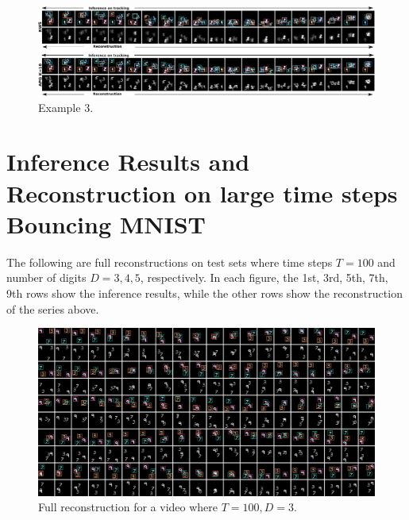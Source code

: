 \documentclass{article}
\theoremstyle{definition}
\begin{document}
\begin{figure}[h!]
\centering
\includegraphics[width=150mm]{figures/bmnist-5digits-samples-with-rws-4.pdf}
\caption{Example 3.}
\end{figure}


\newpage
\section{Inference Results and Reconstruction on large time steps Bouncing MNIST}
\label{appendix:full-recons}
The following are full reconstructions on test sets where time steps $T=100$ and number of digits $D=3, 4, 5$, respectively. In each figure, the 1st, 3rd, 5th, 7th, 9th rows show the inference results, while the other rows show the reconstruction of the series above.
\begin{figure}[h!]
\includegraphics[width=170mm]{figures/T=100-D=3.pdf}
\caption{Full reconstruction for a video where $T=100, D=3$.}
\end{figure}
\end{document}
